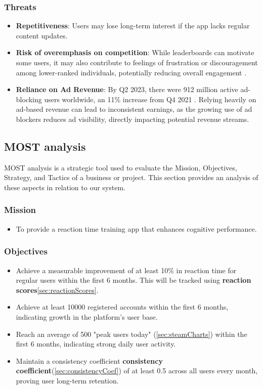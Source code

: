 \documentclass[]{VUMIFTemplateClass}
\begin{document}
\subsubsection{Threats}
\begin{itemize}
    \item \textbf{Repetitiveness}:  Users may lose long-term interest if the app lacks regular content updates\cite{GameplayEngagement}.
    \item \textbf{Risk of overemphasis on competition}: While leaderboards can motivate some users, it may also contribute to feelings of frustration or discouragement among lower-ranked individuals, potentially reducing overall engagement \cite{GameplayEngagement}.
    \item \textbf{Reliance on Ad Revenue}: By Q2 2023, there were 912 million active ad-blocking users worldwide, an 11\% increase from Q4 2021 \cite{BlockAds}. Relying heavily on ad-based revenue can lead to inconsistent earnings, as the growing use of ad blockers reduces ad visibility, directly impacting potential revenue streams.
    
\end{itemize}

\subsection{MOST analysis}
MOST analysis is a strategic tool used to evaluate the Mission, Objectives, Strategy, and Tactics of a business or project. This section provides an analysis of these aspects in relation to our system.

\subsubsection{Mission}
\begin{itemize}
    \item To provide a reaction time training app that enhances cognitive performance.
\end{itemize}

\subsubsection{Objectives}
\begin{itemize}

    \item Achieve a measurable improvement of at least 10\% in reaction time for regular users within the first 6 months. This will be tracked using \textbf{reaction scores}\ref{sec:reactionScores}.
    \item Achieve at least 10000 registered accounts within the first 6 months, indicating growth in the platform's user base.
    \item Reach an average of 500 "peak users today" (\ref{sec:steamCharts}) within the first 6 months, indicating strong daily user activity.
    \item Maintain a consistency coefficient \textbf{consistency coefficient}(\ref{sec:consistencyCoef}) of at least 0.5 across all users every month, proving user long-term retention.
\end{itemize}
\end{document}
